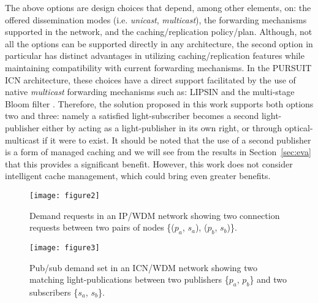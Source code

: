 \documentclass[journal]{IEEEtran}
\begin{document}
 The above options are design choices that depend, among other
 elements, on: the offered dissemination modes (i.e. \emph{unicast},
 \emph{multicast}), the forwarding mechanisms supported in the network, and
 the caching/replication policy/plan. Although, not all the options
 can be supported directly in any architecture, the second option in
 particular has distinct advantages in utilizing caching/replication
 features while maintaining compatibility with current forwarding
 mechanisms. In the PURSUIT ICN architecture, these choices have a
 direct support facilitated by the use of native \emph{multicast} forwarding
 mechanisms such as: LIPSIN \cite{pet:ICnet} and the multi-stage Bloom
 filter \cite{tap:bf}. Therefore, the solution proposed in this
 work supports both options two and three: namely a satisfied
 light-subscriber becomes a second light-publisher either by acting as a light-publisher in its own right, or through optical-multicast if it were to exist. 
It should be noted that the use of a second publisher is a form of
managed caching and we will see from the results in
Section~\ref{sec:eva} that this provides a significant
benefit. However, this work does not consider intelligent cache
management, which could bring even greater benefits.
 
 \begin{figure}[tb]
  \centering
\texttt{[image: figure2]}
  \caption{Demand requests in an IP/WDM network showing two connection requests between two pairs of nodes \{($p_a$, $s_a$), ($p_b$, $s_b$)\}.}
  \label{fig:ipdm}
 \end{figure}
 \begin{figure}[tb]
  \centering
  \texttt{[image: figure3]}
  \caption{Pub/sub demand set in an ICN/WDM network showing two matching light-publications between two publishers \{$p_a$, $p_b$\} and two subscribers \{$s_a$, $s_b$\}.}
  \label{fig:icndm}
 \end{figure}
\end{document}

